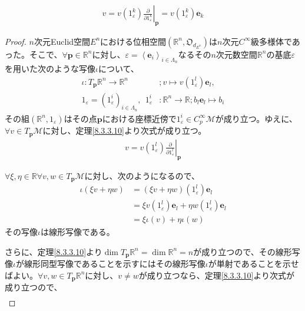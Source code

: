 \documentclass[dvipdfmx]{jsarticle}
\begin{document}
\begin{align*}
  v=v\left(1_\varepsilon^k \right) \left. \frac{\partial }{\partial 1_\varepsilon^k } \right|_\mathbf{p} =v\left(1_\varepsilon^k \right) \mathbf{e}_k
\end{align*}
\begin{proof}
  $n$次元Euclid空間$E^n$における位相空間$\left(\mathbb{R}^n ,\mathfrak{O}_{d_{E^n}}\right)$は$n$次元$C^\infty $級多様体であった。そこで、$\forall \mathbf{p} \in \mathbb{R}^n $に対し、$\varepsilon =\left\langle \mathbf{e}_i \right\rangle_{i\in \varLambda_n } $なるその$n$次元数空間$\mathbb{R}^n $の基底$\varepsilon$を用いた次のような写像$\iota $について、
  \begin{align*}
    \iota :T_\mathbf{p} \mathbb{R}^n \rightarrow \mathbb{R}^n &;v\mapsto v\left(1_\varepsilon^l \right) \mathbf{e}_l ,\\
    1_\varepsilon =\left( 1_\varepsilon^i \right)_{i\in \varLambda_n },\ \ 1_\varepsilon^i &:\mathbb{R}^n \rightarrow \mathbb{R} ;b_l \mathbf{e}_l \mapsto b_i 
  \end{align*}
  その組$\left(\mathbb{R}^n ,1_\varepsilon \right)$はその点$\mathbf{p}$における座標近傍で$1_\varepsilon^i \in C^\infty_p \mathcal{M}$が成り立つ。ゆえに、$\forall v\in T_\mathbf{p} \mathcal{M}$に対し、定理\ref{8.3.3.10}より次式が成り立つ。
  \begin{align*}
    v=v\left(1_\varepsilon^l \right) \left. \frac{\partial }{\partial 1_\varepsilon^l } \right|_\mathbf{p}
  \end{align*}\par
  $\forall \xi ,\eta \in \mathbb{R} \forall v,w\in T_\mathbf{p} \mathcal{M}$に対し、次のようになるので、
  \begin{align*}
    \iota \left(\xi v+\eta w\right) &=\left(\xi v+\eta w\right) \left(1_\varepsilon^l \right) \mathbf{e}_l \\
    &=\xi v \left(1_\varepsilon^l \right) \mathbf{e}_l+\eta w \left(1_\varepsilon^l \right) \mathbf{e}_l \\
    &=\xi \iota \left(v\right)+\eta \iota \left(w\right)
  \end{align*}
  その写像$\iota $は線形写像である。\par
  さらに、定理\ref{8.3.3.10}より$\dim T_\mathbf{p} \mathbb{R}^n =\dim \mathbb{R}^n =n$が成り立つので、その線形写像$\iota $が線形同型写像であることを示すにはその線形写像$\iota $が単射であることを示せばよい。$\forall v,w\in T_\mathbf{p} \mathbb{R}^n $に対し、$v\ne w$が成り立つなら、定理\ref{8.3.3.10}より次式が成り立つので、
  \begin{align*}

\end{align*}
\end{proof}
\end{document}
